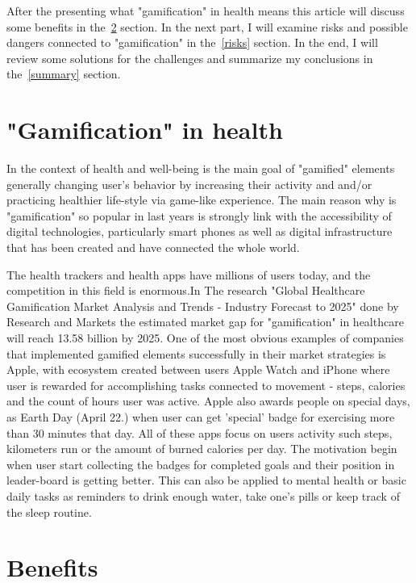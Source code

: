 \documentclass[10pt,twoside,english,a4paper]{article}
\begin{document}
After the presenting what "gamification" in health means this article will discuss some benefits in the~\ref{benefits} section. In the next part, I will examine risks and possible dangers connected to "gamification" in the~\ref{risks} section. In the end, I will review some solutions for the challenges and summarize my conclusions in the~\ref{summary} section.

%
%
%

\section{"Gamification" in health} \label{G-i-H}
In the context of health and well-being is the main goal of "gamified" elements generally changing user's behavior by increasing their activity and and/or practicing healthier life-style via game-like experience. The main reason why is "gamification" so popular in last years is strongly link with the  accessibility of digital technologies, particularly smart phones as well as digital infrastructure\cite{Ethics} that has been created and have connected the whole world. 

The health trackers and health apps have millions of users today, and the competition in this field is enormous.In The research "Global Healthcare Gamification Market Analysis and Trends - Industry Forecast to 2025" done by Research and Markets the estimated market gap for "gamification" in healthcare will reach 13.58 billion by 2025. \cite{mgap}  One of the most obvious examples of companies that implemented gamified elements successfully in their market strategies is Apple, with ecosystem created between users Apple Watch and iPhone where user is rewarded for accomplishing tasks connected to movement - steps, calories and the count of hours user was active.  Apple also awards people on special days, as Earth Day (April 22.) when user can get 'special' badge for exercising more than 30 minutes that day\cite{earthDay}. All of these apps focus on users activity such steps, kilometers run or the amount of burned calories per day. The motivation begin when user start collecting the badges for completed goals and their position in leader-board is getting better. This can also be applied to mental health or basic daily tasks as reminders to drink enough water, take one's pills or keep track of the sleep routine.

%
%
%

\section{Benefits} \label{benefits}
\end{document}
